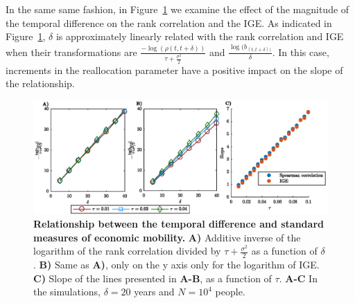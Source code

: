 \documentclass[11pt]{article}
\newcommand{\Fref}[1]{Figure~\ref{fig:#1}}
\numberwithin{equation}{section}
\begin{document}
In the same same fashion, in \Fref{rgbm-standard-measures-delta} we examine the effect of the magnitude of the temporal difference on the rank correlation and the IGE. As indicated in \Fref{rgbm-standard-measures-delta}, $\delta$ is approximately linearly related with the rank correlation and IGE when their transformations are $\frac{-\log(\rho(t,t+\delta))}{\tau + \frac{\sigma^2}{2}}$ and $\frac{\log(b_{(t,t+\delta))}}{\delta}$. In this case, increments in the reallocation parameter have a positive impact on the slope of the relationship.

\begin{figure}[!htb]
\centering
\includegraphics[width=1.0\textwidth]{figs/fig_rgbm_delta_relationship.eps}
\caption{\textbf{Relationship between the temporal difference and standard measures of economic mobility.} \textbf{A)} Additive inverse of the logarithm of the rank correlation divided by $\tau +\frac{\sigma^2}{2}$ as a function of $\delta$. \textbf{B)} Same as \textbf{A)}, only on the y axis only for the logarithm of IGE. \textbf{C)} Slope of the lines presented in \textbf{A-B}, as a function of $\tau$. 
\textbf{A-C} In the simulations, $\delta = 20$ years and $N = 10^4$ people.
\label{fig:rgbm-standard-measures-delta}}
\end{figure}
\FloatBarrier
\end{document}
